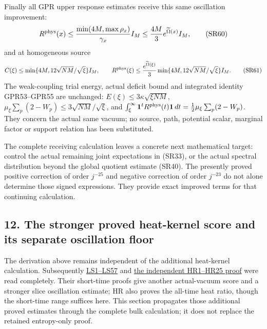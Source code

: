 \documentclass[11pt]{article}
\begin{document}
Finally all GPR upper response estimates receive this same oscillation improvement:
\[
R^{\rm phys}(x)\le {\min(4M,\max\rho_x)\over\gamma_x}I_M
\le {4M\over3}e^{\widetilde\Omega(x)}I_M,
\tag{SR60}
\]
and at homogeneous source
\[
C(\xi)\le\min\{4M,12\sqrt{NM}/\sqrt\xi\}I_M,\qquad
R^{\rm phys}(\xi)\le {e^{\widetilde\Omega(\xi)}\over3}
\min\{4M,12\sqrt{NM}/\sqrt\xi\}I_M.
\tag{SR61}
\]
The weak-coupling trial energy, actual deficit bound and integrated identity GPR53–GPR55 are unchanged:
\(E(\xi)\le3\kappa\sqrt{\xi NM}\),
\(\mu_\xi\sum_p(2-W_p)\le3\sqrt{NM}/\sqrt\xi\), and
\(\int_\xi^\infty\mathbf1^tR^{\rm phys}(t)\mathbf1\,dt=\tfrac12\mu_\xi\sum_p(2-W_p)\).
They concern the actual same vacuum; no source, path, potential scalar, marginal factor or support relation has been substituted.

The complete receiving calculation leaves a concrete next mathematical target: control the actual remaining joint expectations in (SR33), or the actual spectral distribution beyond the global quotient estimate (SR40). The presently proved positive correction of order \(j^{-25}\) and negative correction of order \(j^{-23}\) do not alone determine those signed expressions. They provide exact improved terms for that continuing calculation.

\subsection*{12. The stronger proved heat-kernel score and its separate oscillation floor}

The derivation above remains independent of the additional heat-kernel calculation. Subsequently \href{https://github.com/KokunoYumeto/yang-mills-interacting-workbench/blob/main/yang-mills/continuations/20261011-central-signs-shrinking-window/SQUARE_ROOT_LOCAL_SCORE.md}{LS1–LS57} and \href{https://github.com/KokunoYumeto/yang-mills-interacting-workbench/blob/main/yang-mills/continuations/20261011-central-signs-shrinking-window/HEAT_RATIO_PROOF.md}{the independent HR1–HR25 proof} were read completely. Their short-time proofs give another actual-vacuum score and a stronger slice oscillation estimate; HR also proves the all-time heat ratio, though the short-time range suffices here. This section propagates those additional proved estimates through the complete bulk calculation; it does not replace the retained entropy-only proof.
\end{document}
